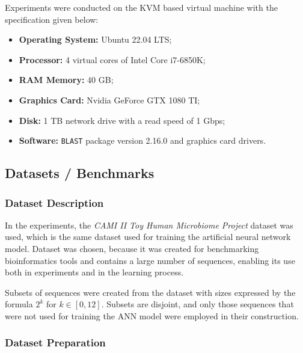 \documentclass{article}
\begin{document}
            Experiments were conducted on the KVM based virtual machine with the specification given below:

            \begin{itemize}
                \item{
                    \textbf{Operating System:} Ubuntu 22.04 LTS;
                }
                \item{
                    \textbf{Processor:} 4 virtual cores of Intel Core i7-6850K;
                }
                \item{
                    \textbf{RAM Memory:} 40 GB;
                }
                \item{
                    \textbf{Graphics Card:} Nvidia GeForce GTX 1080 TI;
                }
                \item{
                    \textbf{Disk:} 1 TB network drive with a read speed of 1 Gbps;
                }
                \item{
                    \textbf{Software:} \texttt{BLAST} package version 2.16.0 and graphics card drivers.
                }
            \end{itemize}

        \subsection{Datasets / Benchmarks}

            \subsubsection{Dataset Description}

                In the experiments, the \textit{CAMI II Toy Human Microbiome Project}\cite{Fritz:2019} dataset was used, which is the same dataset used for training the artificial neural network model. Dataset was chosen, because it was created for benchmarking bioinformatics tools and contains a large number of sequences, enabling its use both in experiments and in the learning process.

                Subsets of sequences were created from the dataset with sizes expressed by the formula $2^k$ for $k \in [0, 12]$. Subsets are disjoint, and only those sequences that were not used for training the ANN model were employed in their construction.

            \subsubsection{Dataset Preparation}
\end{document}
